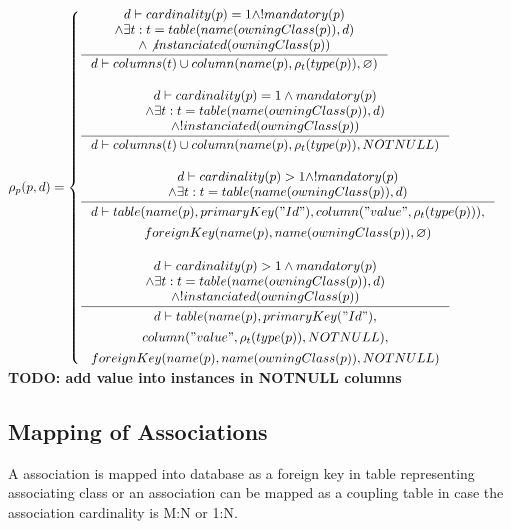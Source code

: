 \documentclass[11pt]{article}
\begin{document}
$\rho_p(p, d) = \begin{cases}
  \inference{ d \vdash cardinality(p) = 1 \wedge ! mandatory(p)
 \\ \wedge \exists t : t = table(name(owningClass(p)), d) 
 \\ \wedge \not instanciated(owningClass(p))
 }{ d \vdash columns(t) \cup column(name(p), \rho_t(type(p)), \varnothing )} \\ \\

  \inference{ d \vdash cardinality(p) = 1 \wedge mandatory(p)
 \\ \wedge \exists t : t = table(name(owningClass(p)), d) 
 \\ \wedge ! instanciated(owningClass(p))
 }{ d \vdash columns(t) \cup column(name(p), \rho_t(type(p)), NOTNULL )} 
\\ \\
 
 \inference{d \vdash cardinality(p) > 1 \wedge ! mandatory(p) \\ \wedge \exists t : t = table(name(owningClass(p)), d)}{\begin{gathered}d \vdash  table(name(p), primaryKey("Id"), column("value", \rho_t(type(p))), \\ foreignKey(name(p), name(owningClass(p)), \varnothing) \end{gathered}}
\\ \\

 \inference{d \vdash cardinality(p) > 1 \wedge mandatory(p) \\ \wedge \exists t : t = table(name(owningClass(p)), d) \\ \wedge ! instanciated(owningClass(p))}{\begin{gathered}d \vdash  table(name(p), primaryKey("Id"), \\ column("value", \rho_t(type(p)), NOTNULL), \\ foreignKey(name(p), name(owningClass(p)), NOTNULL) \end{gathered}}
\\
 \end{cases}$
\textbf{TODO: add value into instances in NOTNULL columns}

\subsection{Mapping of Associations}
A association is mapped into database as a foreign key in table representing associating class or an association can be mapped as a coupling table in case the association cardinality is M:N or 1:N.
\end{document}

